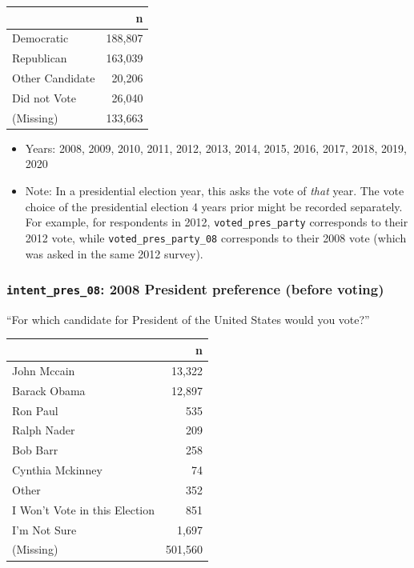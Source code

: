 \documentclass[10pt,article,oneside]{memoir}
\theoremstyle{definition}
\begin{document}
\begin{table}[H]
\centering
\begin{tabular}[t]{lr}
\toprule
 & n\\
\midrule
Democratic & 188,807\\
Republican & 163,039\\
Other Candidate & 20,206\\
Did not Vote & 26,040\\
(Missing) & 133,663\\
\bottomrule
\end{tabular}
\end{table}

\begin{itemize}
\tightlist
\item
  Years: 2008, 2009, 2010, 2011, 2012, 2013, 2014, 2015, 2016, 2017,
  2018, 2019, 2020
\item
  Note: In a presidential election year, this asks the vote of
  \emph{that} year. The vote choice of the presidential election 4 years
  prior might be recorded separately. For example, for respondents in
  2012, \texttt{voted\_pres\_party} corresponds to their 2012 vote,
  while \texttt{voted\_pres\_party\_08} corresponds to their 2008 vote
  (which was asked in the same 2012 survey).
\end{itemize}

\hypertarget{intent_pres_08-2008-president-preference-before-voting}{%
\subsubsection{\texorpdfstring{\texttt{intent\_pres\_08}: 2008 President
preference (before
voting)}{intent\_pres\_08: 2008 President preference (before voting)}}\label{intent_pres_08-2008-president-preference-before-voting}}

``For which candidate for President of the United States would you
vote?''

\begin{table}[H]
\centering
\begin{tabular}[t]{lr}
\toprule
 & n\\
\midrule
John Mccain & 13,322\\
Barack Obama & 12,897\\
Ron Paul & 535\\
Ralph Nader & 209\\
Bob Barr & 258\\
Cynthia Mckinney & 74\\
Other & 352\\
I Won't Vote in this Election & 851\\
I'm Not Sure & 1,697\\
(Missing) & 501,560\\
\bottomrule
\end{tabular}
\end{table}
\end{document}
